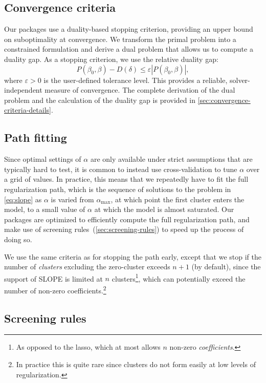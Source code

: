 \documentclass[article]{jss}
\begin{document}
\subsection{Convergence criteria}

Our packages use a duality-based stopping criterion, providing an upper bound
on suboptimality at convergence. We transform the primal problem into a
constrained formulation and derive a dual problem that allows us to compute a
duality gap. As a stopping criterion, we use the relative duality gap: \[
  P(\beta_0, \beta) - D(\delta) \leq \varepsilon | P(\beta_0, \beta) |, \] where
\(\varepsilon >0\) is the user-defined tolerance level. This provides a
reliable, solver-independent measure of convergence. The complete derivation of
the dual problem and the calculation of the duality gap is provided in
\autoref{sec:convergence-criteria-details}.

\subsection{Path fitting}

Since optimal settings of \(\alpha\) are only available under strict
assumptions that are typically hard to test, it is common to instead use
cross-validation to tune \(\alpha\) over a grid of values. In practice, this
means that we repeatedly have to fit the full regularization path, which is the
sequence of solutions to the problem in \autoref{eq:slope} as \(\alpha\) is varied
from \(\alpha_\text{max}\), at which point the first cluster enters the model,
to a small value of \(\alpha\) at which the model is almost saturated. Our
packages are optimized to efficiently compute the full regularization path, and
make use of  screening rules~(\autoref{sec:screening-rules}) to speed up the
process of doing so.

We use the same criteria as \citet{friedman2010} for stopping the path early,
except that we stop if the number of \emph{clusters} excluding the zero-cluster
exceeds \(n + 1\) (by default), since the support of SLOPE is limited at \(n\)
clusters\footnote{ As opposed to the lasso, which at most allows \(n\) non-zero
  \emph{coefficients}. }, which can potentially exceed the number of non-zero
coefficients.\footnote{In practice this is quite rare since clusters do not
  form easily at low levels of regularization.}

\subsection{Screening rules}\label{sec:screening-rules}
\end{document}
